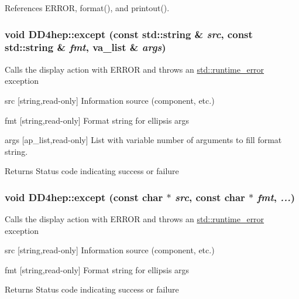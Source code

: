 References ERROR, format(), and printout().\hypertarget{namespace_d_d4hep_a4a02ec0c7a458f972986c141672a044c}{
\subsubsection[{except}]{\setlength{\rightskip}{0pt plus 5cm}void DD4hep::except (const std::string \& {\em src}, \/  const std::string \& {\em fmt}, \/  va\_\-list \& {\em args})}}
\label{namespace_d_d4hep_a4a02ec0c7a458f972986c141672a044c}
Calls the display action with ERROR and throws an \hyperlink{classstd_1_1runtime__error}{std::runtime\_\-error} exception \begin{DoxyItemize}
\item src \mbox{[}string,read-\/only\mbox{]} Information source (component, etc.) \item fmt \mbox{[}string,read-\/only\mbox{]} Format string for ellipsis args \item args \mbox{[}ap\_\-list,read-\/only\mbox{]} List with variable number of arguments to fill format string. \begin{DoxyReturn}{Returns}
Status code indicating success or failure 
\end{DoxyReturn}
\end{DoxyItemize}
\hypertarget{namespace_d_d4hep_a7fe7772a289c1e2eb3587ea99900827b}{
\subsubsection[{except}]{\setlength{\rightskip}{0pt plus 5cm}void DD4hep::except (const char $\ast$ {\em src}, \/  const char $\ast$ {\em fmt}, \/   {\em ...})}}
\label{namespace_d_d4hep_a7fe7772a289c1e2eb3587ea99900827b}
Calls the display action with ERROR and throws an \hyperlink{classstd_1_1runtime__error}{std::runtime\_\-error} exception \begin{DoxyItemize}
\item src \mbox{[}string,read-\/only\mbox{]} Information source (component, etc.) \item fmt \mbox{[}string,read-\/only\mbox{]} Format string for ellipsis args \begin{DoxyReturn}{Returns}
Status code indicating success or failure 
\end{DoxyReturn}
\end{DoxyItemize}


